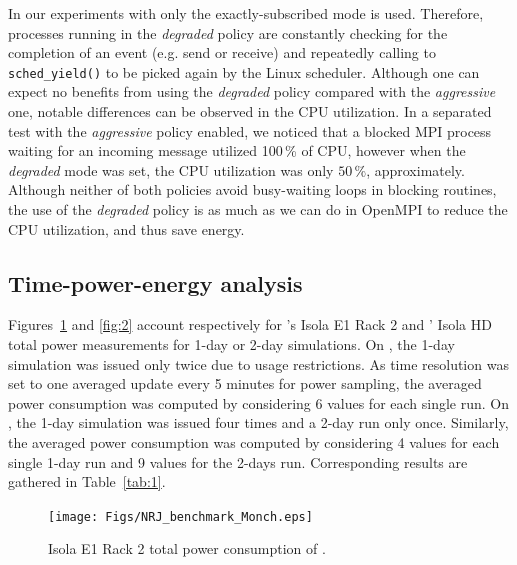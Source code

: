 In our experiments with  \cosmoart only the exactly-subscribed mode is
used.  Therefore, \cosmoart processes  running in  the \emph{degraded}
policy are  constantly checking for  the completion of an  event (e.g.
send or receive) and  repeatedly calling to \texttt{sched\_yield()} to
be picked  again by  the Linux scheduler.  Although one can  expect no
benefits  from  using the  \emph{degraded}  policy  compared with  the
\emph{aggressive} one, notable differences  can be observed in the CPU
utilization.  In  a separated  test with the  \emph{aggressive} policy
enabled, we noticed that a blocked MPI process waiting for an incoming
message utilized 100\,\% of CPU, however when the \emph{degraded} mode
was  set,  the  CPU  utilization  was  only  $50\,\%$,  approximately.
Although neither of both policies avoid busy-waiting loops in blocking
routines, the use  of the \emph{degraded} policy is as  much as we can
do in OpenMPI to reduce the CPU utilization, and thus save energy.


\subsection{Time-power-energy analysis}
\label{subsec:4.2}

Figures~\ref{fig:1} and \ref{fig:2}  account respectively for \monch's
Isola  E1 Rack 2  and \pilat'  Isola HD  total power  measurements for
1-day or 2-day simulations. On \monch, the 1-day simulation was issued
only twice due  to usage restrictions.  As time  resolution was set to
one averaged update  every 5 minutes for power  sampling, the averaged
power consumption was computed by considering 6 values for each single
run.   On \pilat, the  1-day simulation  was issued  four times  and a
2-day run  only once.  Similarly,  the averaged power  consumption was
computed  by considering  4 values  for each  single 1-day  run  and 9
values  for the  2-days  run. Corresponding  results  are gathered  in
Table~\ref{tab:1}.

\begin{figure}[ht]
  \centering
  \texttt{[image: Figs/NRJ\_benchmark\_Monch.eps]}
  \caption{Isola E1 Rack 2 total power consumption of \monch.}
  \label{fig:1}
\end{figure}

